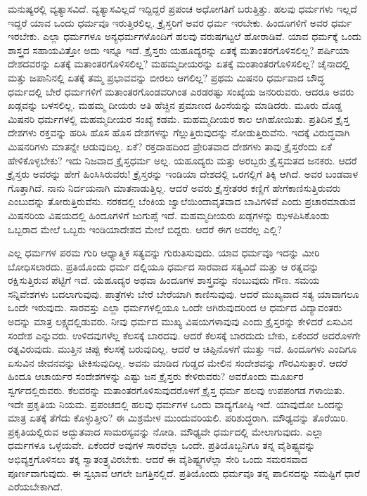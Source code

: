 ಮನುಷ್ಯರಲ್ಲಿ ವ್ಯತ್ಯಾಸವಿದೆ. ವ್ಯತ್ಯಾಸವಿಲ್ಲದೆ ಇದ್ದಿದ್ದರೆ ಪ್ರಪಂಚ ಅಧೋಗತಿಗೆ ಬರುತ್ತಿತ್ತು. ಹಲವು ಧರ್ಮಗಳು ಇಲ್ಲದೆ ಇದ್ದರೆ ಯಾವ ಒಂದು ಧರ್ಮವೂ ಇರುತ್ತಿರಲಿಲ್ಲ. ಕ್ರೈಸ್ತರಿಗೆ ಅವರ ಧರ್ಮ ಇರಬೇಕು. ಹಿಂದೂಗಳಿಗೆ ಅವರ ಧರ್ಮ ಇರಬೇಕು. ಎಲ್ಲಾ ಧರ್ಮಗಳೂ ಅನ್ಯಧರ್ಮಗಳೊಂದಿಗೆ ಹಲವು ವರುಷಗಟ್ಟಲೆ ಹೋರಾಡಿವೆ. ಯಾವ ಧರ್ಮಕ್ಕೆ ಒಂದು ಶಾಸ್ತ್ರದ ಸಹಾಯವಿತ್ತೋ ಅದು ಇನ್ನೂ ಇದೆ. ಕ್ರೈಸ್ತರು ಯಹೂದ್ಯರನ್ನು ಏತಕ್ಕೆ ಮತಾಂತರಗೊಳಿಸಲಿಲ್ಲ? ಪರ್ಷಿಯಾ ದೇಶದವರನ್ನು ಏತಕ್ಕೆ ಮತಾಂತರಗೊಳಿಸಲಿಲ್ಲ? ಮಹಮ್ಮದೀಯರನ್ನು ಏತಕ್ಕೆ ಮಂತಾಂತರಗೊಳಿಸಲಿಲ್ಲ? ಚೈನಾದಲ್ಲಿ ಮತ್ತು ಜಪಾನಿನಲ್ಲಿ ಏತಕ್ಕೆ ತಮ್ಮ ಪ್ರಭಾವವನ್ನು ಬೀರಲು ಆಗಲಿಲ್ಲ? ಪ್ರಥಮ ಮಿಷನರಿ ಧರ್ಮವಾದ ಬೌದ್ಧ ಧರ್ಮದಲ್ಲಿ ಬೇರೆ ಧರ್ಮಗಳಿಗೆ ಮತಾಂತರಗೊಂಡವರಿಗಿಂತ ಎರಡರಷ್ಟು ಸಂಖ್ಯೆಯ ಜನರಿರುವರು. ಆದರೂ ಅವರು ಖಡ್ಗವನ್ನು ಬಳಸಲಿಲ್ಲ. ಮಹಮ್ಮ ದೀಯರು ಅತಿ ಹೆಚ್ಚಿನ ಪ್ರಮಾಣದ ಹಿಂಸೆಯನ್ನು ಮಾಡಿದರು. ಮೂರು ದೊಡ್ಡ ಮಿಷನರಿ ಧರ್ಮಗಳಲ್ಲಿ ಮಹಮ್ಮದೀಯರ ಸಂಖ್ಯೆ ಕಡಮೆ. ಮಹಮ್ಮದೀಯರ ಕಾಲ ಆಗಿಹೋಯಿತು. ಪ್ರತಿದಿನ ಕ್ರೈಸ್ತ ದೇಶಗಳು ರಕ್ತವನ್ನು ಹರಿಸಿ ಹೊಸ ಹೊಸ ದೇಶಗಳನ್ನು ಗೆಲ್ಲುತ್ತಿರುವುದನ್ನು ನೋಡುತ್ತಿರುವೆನು. ಇದಕ್ಕೆ ವಿರುದ್ಧವಾಗಿ ಮಿಷನರಿಗಳು ಮಾತನ್ನೇ ಆಡುವುದಿಲ್ಲ. ಏಕೆ? ರಕ್ತದಾಹದಿಂದ ಪ್ರೇರಿತವಾದ ದೇಶಗಳು ತಾವು ಕ್ರೈಸ್ತರೆಂದು ಏಕೆ ಹೇಳಿಕೊಳ್ಳಬೇಕು? ಇದು ನಿಜವಾದ ಕ್ರೈಸ್ತಧರ್ಮ ಅಲ್ಲ. ಯಹೂದ್ಯರು ಮತ್ತು ಅರಬ್ಬರು ಕ್ರೈಸ್ತಮತದ ಜನಕರು. ಆದರೆ ಕ್ರೈಸ್ತರು ಅವರನ್ನು ಹೇಗೆ ಹಿಂಸಿಸಿರುವರು! ಕ್ರೈಸ್ತರನ್ನು ಇಂಡಿಯಾ ದೇಶದಲ್ಲಿ ಒರಗಲ್ಲಿಗೆ ತಿಕ್ಕಿ ಆಗಿದೆ. ಅವರ ಬಂಡವಾಳ ಗೊತ್ತಾಗಿದೆ. ನಾನು ನಿರ್ದಯನಾಗಿ ಮಾತನಾಡುತ್ತಿಲ್ಲ. ಆದರೆ ಅವರು ಕ್ರೈಸ್ತೇತರರ ಕಣ್ಣಿಗೆ ಹೇಗೆಕಾಣಿಸುತ್ತಿರುವರು ಎಂಬುದನ್ನು ತೋರುತ್ತಿರುವೆನು. ನರಕದಲ್ಲಿ ಬೆಂಕಿಯ ಜ್ವಾಲೆಯಿಂದಾವೃತವಾದ ಬಾವಿಗಳಿವೆ ಎಂದು ಪ್ರಚಾರಮಾಡುವ ಮಿಷನರಿಯ ವಿಷಯದಲ್ಲಿ ಹಿಂದೂಗಳಿಗೆ ಜುಗುಪ್ಸೆ ಇದೆ. ಮಹಮ್ಮದೀಯರು ಖಡ್ಗಗಳನ್ನು ಝಳಪಿಸಿಕೊಂಡು ಒಬ್ಬರಾದ ಮೇಲೆ ಒಬ್ಬರು ಇಂಡಿಯಾದೇಶದ ಮೇಲೆ ಬಿದ್ದರು. ಆದರೆ ಈಗ ಅವರೆಲ್ಲ ಎಲ್ಲಿ?

ಎಲ್ಲ ಧರ್ಮಗಳ ಪರಮ ಗುರಿ ಆಧ್ಯಾತ್ಮಿಕ ಸತ್ಯವನ್ನು ಗುರುತಿಸುವುದು. ಯಾವ ಧರ್ಮವೂ ಇದನ್ನು ಮೀರಿ ಬೋಧಿಸಲಾರದು. ಪ್ರತಿಯೊಂದು ಧರ್ಮ ದಲ್ಲಿಯೂ ಧರ್ಮದ ಸಾರವಾದ ಸತ್ಯವಿದೆ ಮತ್ತು ಆ ರತ್ನವನ್ನು ರಕ್ಷಿಸುತ್ತಿರುವ ಪೆಟ್ಟಿಗೆ ಇದೆ. ಯೆಹೂದ್ಯರ ಅಥವಾ ಹಿಂದೂಗಳ ಶಾಸ್ತ್ರವನ್ನು ನಂಬುವುದು ಗೌಣ. ಸಮಯ ಸನ್ನಿವೇಶಗಳು ಬದಲಾಗುವುವು. ಪಾತ್ರೆಗಳು ಬೇರೆ ಬೇರೆಯಾಗಿ ಕಾಣಿಸುವುವು. ಆದರೆ ಮುಖ್ಯವಾದ ಸತ್ಯ ಯಾವಾಗಲೂ ಒಂದೇ ಇರುವುದು. ಸಾರವಸ್ತು ಎಲ್ಲಾ ಧರ್ಮಗಳಲ್ಲಿಯೂ ಒಂದೇ ಆಗಿರುವುದರಿಂದ ಆ ಧರ್ಮದ ವಿದ್ಯಾವಂತರು ಅದನ್ನು ಮಾತ್ರ ಲಕ್ಷ್ಯದಲ್ಲಿಡುವರು. ನೀವು ಧರ್ಮದ ಮುಖ್ಯ ವಿಷಯಗಳಾವುವು ಎಂದು ಕ್ರೈಸ್ತರನ್ನು ಕೇಳಿದರೆ ಏಸುವಿನ ಸಂದೇಶ ಎನ್ನುವರು. ಉಳಿದವುಗಳೆಲ್ಲ ಕೆಲಸಕ್ಕೆ ಬಾರದವು. ಆದರೆ ಕೆಲಸಕ್ಕೆ ಬಾರದುದು ಬೇಕು, ಏಕೆಂದರೆ ಅದರೊಳಗೇ ರತ್ನವಿರುವುದು. ಮುತ್ತಿನ ಚಿಪ್ಪು ಕೆಲಸಕ್ಕೆ ಬರುವುದಿಲ್ಲ. ಆದರೆ ಆ ಚಿಪ್ಪಿನೊಳಗೆ ಮುತ್ತು ಇದೆ. ಹಿಂದೂಗಳು ಎಂದಿಗೂ ಏಸುವಿನ ಜೀವನವನ್ನು ಟೀಕಿಸುವುದಿಲ್ಲ. ಅವನು ಮಾಡಿದ ಗುಡ್ಡದ ಮೇಲಿನ ಸಂದೇಶವನ್ನು ಗೌರವಿಸುತ್ತಾರೆ. ಆದರೆ ಹಿಂದೂ ಆಚಾರ್ಯರ ಸಂದೇಶಗಳನ್ನು ಎಷ್ಟು ಜನ ಕ್ರೈಸ್ತರು ಕೇಳಿರುವರು? ಅವರೊಂದು ಮೂರ್ಖರ ಸ್ವರ್ಗದಲ್ಲಿರುವರು. ಕೆಲವರನ್ನು ಮತಾಂತರಗೊಳಿಸುವುದರೊಳಗೆ ಕ್ರೈಸ್ತ ಧರ್ಮ ಹಲವು ಉಪಪಂಗಡ ಗಳಾಯಿತು. ಇದೇ ಪ್ರಕೃತಿಯ ನಿಯಮ. ಪ್ರಪಂಚದಲ್ಲಿ ಹಲವು ಧರ್ಮಗಳ ಒಂದು ವಾದ್ಯಗೋಷ್ಠಿ ಇದೆ. ಯಾವುದೋ ಒಂದನ್ನು ಮಾತ್ರ ಏತಕ್ಕೆ ತೆಗೆದು ಕೊಳ್ಳುತ್ತೀರಿ? ಈ ಮಿಶ್ರಮೇಳ ಮುಂದುವರಿಯಲಿ. ಪರಿಶುದ್ಧರಾಗಿ. ಮೌಢ್ಯವನ್ನು ತೊರೆಯಿರಿ. ಪ್ರಕೃತಿಯಲ್ಲಿರುವ ಅದ್ಭುತವಾದ ಸಾಮರಸ್ಯವನ್ನು ನೋಡಿ. ಮೌಢ್ಯವೇ ಧರ್ಮದಲ್ಲಿ ಮೇಲಾಗುವುದು. ಎಲ್ಲಾ ಧರ್ಮಗಳೂ ಒಳ್ಳೆಯವೇ. ಏಕೆಂದರೆ ಅವುಗಳ ಸಾರವೆಲ್ಲಾ ಒಂದೇ. ಪ್ರತಿಯೊಬ್ಬನಿಗೂ ತನ್ನ ವೈಶಿಷ್ಟ್ಯವನ್ನು ಅಭಿವ್ಯಕ್ತಗೊಳಿಸಲು ತಕ್ಕ ಸ್ವಾತಂತ್ರ್ಯವಿರಬೇಕು. ಆದರೆ ಈ ವೈಶಿಷ್ಟ್ಯಗಳೆಲ್ಲಾ ಸೇರಿ ಒಂದು ಸಮರಸವಾದ ಪೂರ್ಣವಾಗುವುದು. ಈ ಸ್ವಭಾವ ಆಗಲೇ ಜಗತ್ತಿನಲ್ಲಿದೆ. ಪ್ರತಿಯೊಂದು ಧರ್ಮವೂ ತನ್ನ ಪಾಲಿನದನ್ನು ಸಮಷ್ಟಿಗೆ ಧಾರೆ ಎರೆಯಬೇಕಾಗಿದೆ.


